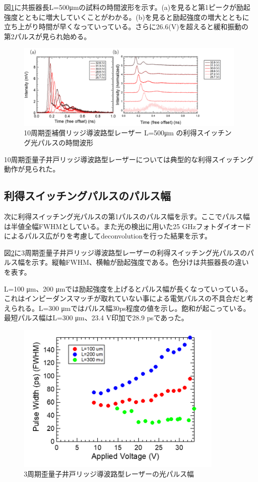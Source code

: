 {%
図\ref{fig:fig_3_2_10QW_ridge_L500_GS}に共振器長L=500\si{\micro\metre}の試料の時間波形を示す。(a)を見ると第1ピークが励起強度とともに増大していくことがわかる。(b)を見ると励起強度の増大とともに立ち上がり時間が早くなっていっている。さらに26.6(V)を超えると緩和振動の第2パルスが見られ始める。
\begin{figure}[h]
	\centering
	\includegraphics[width=15cm]{figure/fig_3_2_10QW_ridge_L500_GS.png}
		\caption{10周期歪補償リッジ導波路型レーザー L=500\si{\micro\metre} の利得スイッチング光パルスの時間波形}
		\label{fig:fig_3_2_10QW_ridge_L500_GS}
\end{figure}

\newpage
10周期歪量子井戸リッジ導波路型レーザーについては典型的な利得スイッチング動作が見られた。
\clearpage
\subsection{利得スイッチングパルスのパルス幅}%
次に利得スイッチング光パルスの第1パルスのパルス幅を示す。ここでパルス幅は半値全幅FWHMとしている。また光の検出に用いた25 GHzフォトダイオードによるパルス広がりを考慮してdeconvolutionを行った結果を示す。

図\ref{fig:fig_3_2_3QW_ridge_GS_FWHM}に3周期歪量子井戸リッジ導波路型レーザーの利得スイッチング光パルスのパルス幅を示す。縦軸FWHM、横軸が励起強度である。色分けは共振器長の違いを表す。

L=100 \si{\micro\metre}、200 \si{\micro\metre}では励起強度を上げるとパルス幅が長くなっていっている。これはインピーダンスマッチが取れていない事による電気パルスの不具合だと考えられる。L=300 \si{\micro\metre}ではパルス幅30ps程度の値を示し。飽和が起こっている。最短パルス幅はL=300 \si{\micro m}、23.4 V印加で28.9 psであった。
\begin{figure}[h]
	\centering
	\includegraphics[width=10cm]{figure/fig_3_2_3QW_ridge_GS_FWHM.png}
		\caption{3周期歪量子井戸リッジ導波路型レーザーの光パルス幅}
		\label{fig:fig_3_2_3QW_ridge_GS_FWHM}
\end{figure}

}
